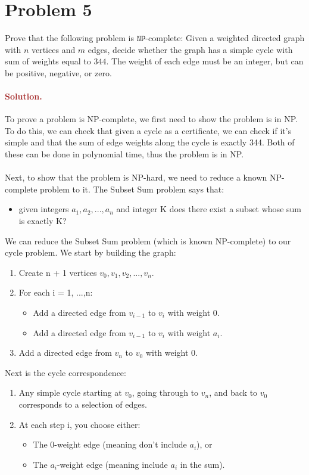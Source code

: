 \section*{Problem 5}
Prove that the following problem is $\mathtt{NP}$-complete: Given a weighted directed graph with $n$ vertices and $m$ edges, decide whether the graph has a simple cycle with sum of weights equal to $344$. The weight of each edge must be an integer, but can be positive, negative, or zero.

\paragraph{\textcolor{brown}{Solution.}}
To prove a problem is NP-complete, we first need to show the problem is in NP. To do this, we can check that given a cycle as a certificate, we can check if it's simple and that the sum of edge weights along the cycle is exactly 344. Both of these can be done in polynomial time, thus the problem is in NP. 
\\ \\ Next, to show that the problem is NP-hard, we need to reduce a known NP-complete problem to it. The Subset Sum problem says that: 
\begin{itemize} \item given integers $a_1, a_2, ..., a_n$ and integer K does there exist a subset whose sum is exactly K? \end{itemize}
We can reduce the Subset Sum problem (which is known NP-complete) to our cycle problem. We start by building the graph:
\begin{enumerate} \item Create n + 1 vertices $v_0, v_1, v_2, ..., v_n$. \item For each i = 1, ...,n: \begin{itemize} \item Add a directed edge from $v_{i-1}$ to $v_i$ with weight 0. \item Add a directed edge from $v_{i-1}$ to $v_i$ with weight $a_i$. \end{itemize} \item Add a directed edge from $v_n$ to $v_0$ with weight 0. \end{enumerate}
Next is the cycle correspondence:
\begin{enumerate} \item Any simple cycle starting at $v_0$, going through to $v_n$, and back to $v_0$ corresponds to a selection of edges. \item At each step i, you choose either: \begin{itemize} \item The 0-weight edge (meaning don't include $a_i$), or \item The $a_i$-weight edge (meaning include $a_i$ in the sum). \end{itemize} \end{enumerate}
